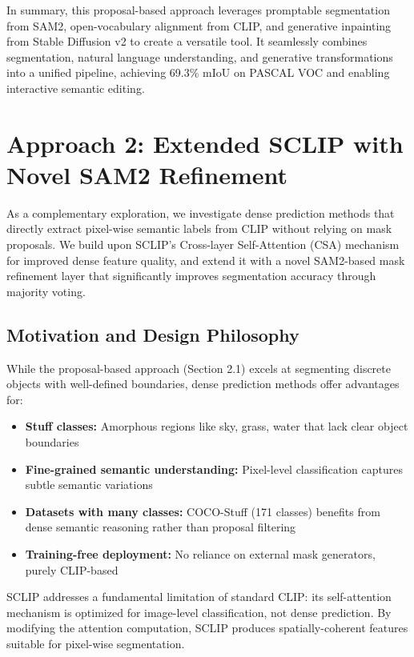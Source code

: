 In summary, this proposal-based approach leverages promptable segmentation from SAM2, open-vocabulary alignment from CLIP, and generative inpainting from Stable Diffusion v2 to create a versatile tool. It seamlessly combines segmentation, natural language understanding, and generative transformations into a unified pipeline, achieving 69.3\% mIoU on PASCAL VOC and enabling interactive semantic editing.

\section{Approach 2: Extended SCLIP with Novel SAM2 Refinement}

As a complementary exploration, we investigate dense prediction methods that directly extract pixel-wise semantic labels from CLIP without relying on mask proposals. We build upon SCLIP's \cite{sclip2024} Cross-layer Self-Attention (CSA) mechanism for improved dense feature quality, and extend it with a novel SAM2-based mask refinement layer that significantly improves segmentation accuracy through majority voting.

\subsection{Motivation and Design Philosophy}

While the proposal-based approach (Section 2.1) excels at segmenting discrete objects with well-defined boundaries, dense prediction methods offer advantages for:

\begin{itemize}
    \item \textbf{Stuff classes:} Amorphous regions like sky, grass, water that lack clear object boundaries
    \item \textbf{Fine-grained semantic understanding:} Pixel-level classification captures subtle semantic variations
    \item \textbf{Datasets with many classes:} COCO-Stuff (171 classes) benefits from dense semantic reasoning rather than proposal filtering
    \item \textbf{Training-free deployment:} No reliance on external mask generators, purely CLIP-based
\end{itemize}

SCLIP addresses a fundamental limitation of standard CLIP: its self-attention mechanism is optimized for image-level classification, not dense prediction. By modifying the attention computation, SCLIP produces spatially-coherent features suitable for pixel-wise segmentation.

